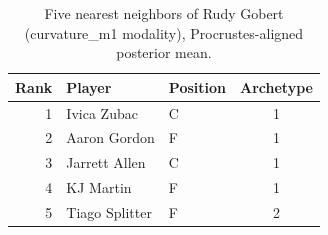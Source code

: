 \begin{table}[htbp]
  \centering\small
  \begin{tabular}{rllc}
    \toprule
    Rank & Player & Position & Archetype \\
    \midrule
    1 & Ivica Zubac & C & 1 \\
    2 & Aaron Gordon & F & 1 \\
    3 & Jarrett Allen & C & 1 \\
    4 & KJ Martin & F & 1 \\
    5 & Tiago Splitter & F & 2 \\
    \bottomrule
  \end{tabular}
  \caption{Five nearest neighbors of Rudy Gobert (curvature_m1 modality), Procrustes-aligned posterior mean.}
  \label{tab:Rudy_Gobert_neighbors_curvature_m1}
\end{table}

